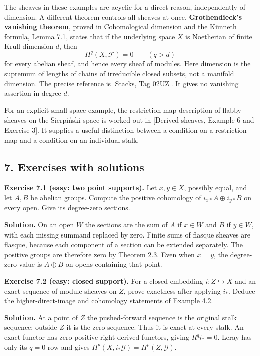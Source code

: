 \documentclass[11pt]{article}
\begin{document}
The sheaves in these examples are acyclic for a direct reason,
independently of dimension. A different theorem controls all sheaves at
once. \textbf{Grothendieck's vanishing theorem}, proved in
\href{../ag-etale-cohomology/cohomological-dimension-and-the-kunneth-formula.html\#7-the-bound-for-all-finite-type-schemes}{Cohomological
dimension and the Künneth formula, Lemma 7.1}, states that if the
underlying space \(X\) is Noetherian of finite Krull dimension \(d\),
then \[
H^q(X,\mathcal F)=0\qquad(q>d)
\] for every abelian sheaf, and hence every sheaf of modules. Here
dimension is the supremum of lengths of chains of irreducible closed
subsets, not a manifold dimension. The precise reference is {[}Stacks,
Tag 02UZ{]}. It gives no vanishing assertion in degree \(d\).

For an explicit small-space example, the restriction-map description of
flabby sheaves on the Sierpiński space is worked out in {[}Derived
sheaves, Example 6 and Exercise 3{]}. It supplies a useful distinction
between a condition on a restriction map and a condition on an
individual stalk.

\subsection{7. Exercises with solutions}\label{exercises-with-solutions}

\textbf{Exercise 7.1 (easy: two point supports).} Let \(x,y\in X\),
possibly equal, and let \(A,B\) be abelian groups. Compute the positive
cohomology of \(i_{x*}A\oplus i_{y*}B\) on every open. Give its
degree-zero sections.

\textbf{Solution.} On an open \(W\) the sections are the sum of \(A\) if
\(x\in W\) and \(B\) if \(y\in W\), with each missing summand replaced
by zero. Finite sums of flasque sheaves are flasque, because each
component of a section can be extended separately. The positive groups
are therefore zero by Theorem 2.3. Even when \(x=y\), the degree-zero
value is \(A\oplus B\) on opens containing that point.

\textbf{Exercise 7.2 (easy: closed support).} For a closed embedding
\(i:Z\hookrightarrow X\) and an exact sequence of module sheaves on
\(Z\), prove exactness after applying \(i_*\). Deduce the
higher-direct-image and cohomology statements of Example 4.2.

\textbf{Solution.} At a point of \(Z\) the pushed-forward sequence is
the original stalk sequence; outside \(Z\) it is the zero sequence. Thus
it is exact at every stalk. An exact functor has zero positive right
derived functors, giving \(R^qi_*=0\). Leray has only its \(q=0\) row
and gives \(H^p(X,i_*\mathcal G)=H^p(Z,\mathcal G)\).
\end{document}
